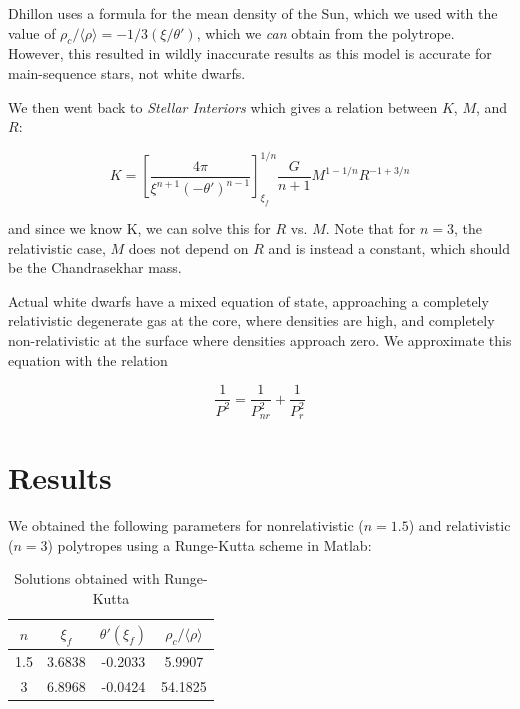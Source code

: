 \documentclass[twoside]{article}
\begin{document}
\begin{multicols}{2}
Dhillon uses a formula for the mean density of the Sun, which we used with the
value of \(\rho_c/\langle \rho \rangle = -1/3 (\xi/\theta') \), which we \emph{can} obtain from the
polytrope. However, this resulted in wildly inaccurate results as this model
is accurate for main-sequence stars, not white dwarfs.

We then went back to \emph{Stellar Interiors}\cite[p.336]{hansen2004} which
gives a relation between \(K\), \(M\), and \(R\):

\begin{equation}
    \label{eq:kmr}
    K = \left[\frac{4\pi}{\xi^{n+1}(-\theta')^{n-1}}\right]_{\xi_f}^{1/n}
    \frac{G}{n+1}M^{1-1/n}R^{-1+3/n}
\end{equation}

and since we know K, we can solve this for \(R\) vs. \(M\). Note that for
\(n=3\), the relativistic case, \(M\) does not depend on \(R\) and is instead a
constant, which should be the Chandrasekhar mass.

Actual white dwarfs have a mixed equation of state, approaching a completely
relativistic degenerate gas at the core, where densities are high, and
completely non-relativistic at the surface where densities approach zero. We
approximate this equation with the relation 

\begin{equation}
    \label{eq:mixedstate}
    \frac{1}{P^2} = \frac{1}{P_{nr}^2}+\frac{1}{P_r^2}
\end{equation}


\section{Results}

We obtained the following parameters for nonrelativistic (\(n=1.5\)) and
relativistic (\(n=3\)) polytropes using a Runge-Kutta scheme in Matlab:

\begin{table}[H]
\caption{Solutions obtained with Runge-Kutta}
\centering
\begin{tabular}{c | c c c}
\toprule
\(n\) & \(\xi_f\) & \(\theta'(\xi_f)\) & \(\rho_c/\langle \rho \rangle\) \\
\midrule
1.5 & 3.6838 & -0.2033 & 5.9907 \\
3 & 6.8968 & -0.0424 & 54.1825 \\
\bottomrule
\end{tabular}
\end{table}



\end{multicols}
\end{document}
